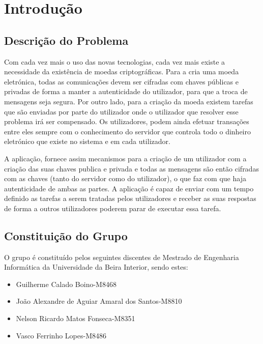 \chapter{Introdução}
\label{chap:int}



\section{Descrição do Problema}
Com cada vez mais o uso das novas tecnologias, cada vez mais existe a necessidade da existência de moedas criptográficas. Para a cria uma moeda eletrónica, todas as comunicações devem ser cifradas com chaves públicas e privadas de forma a manter a autenticidade do utilizador, para que a troca de mensagens seja segura. Por outro lado, para a criação da moeda existem tarefas que são enviadas por parte do utilizador onde o utilizador que resolver esse problema irá ser compensado. Os utilizadores, podem ainda efetuar transações entre eles sempre com o conhecimento do servidor que controla todo o dinheiro eletrónico que existe no sistema e em cada utilizador.


A aplicação, fornece assim mecanismos para a criação de um utilizador com a criação das suas chaves publica e privada e todas as mensagens são então cifradas com as chaves (tanto do servidor como do utilizador), o que faz com que haja autenticidade de ambas as partes. A aplicação é capaz de enviar com um tempo definido as tarefas a serem tratadas pelos utilizadores e receber as suas respostas de forma a outros utilizadores poderem parar de executar essa tarefa.


\section{Constituição do Grupo}
O grupo é constituído pelos seguintes discentes de Mestrado de Engenharia Informática da Universidade da Beira Interior, sendo estes:

\begin{itemize}
    \item Guilherme Calado Boino-M8468
    
    \item João Alexandre de Aguiar Amaral dos Santos-M8810
    
    \item Nelson Ricardo Matos Fonseca-M8351
    
    \item Vasco Ferrinho Lopes-M8486
    
\end{itemize}




